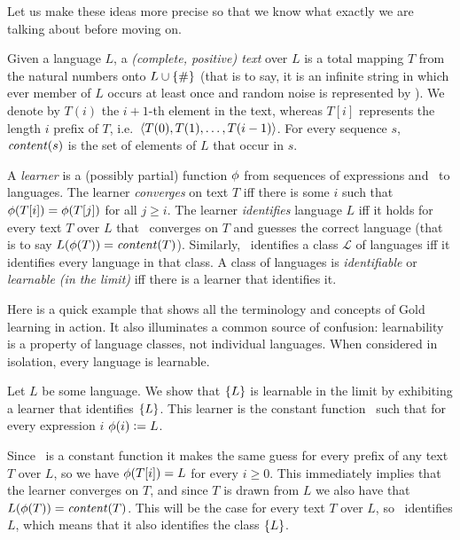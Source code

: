 Let us make these ideas more precise so that we know what exactly we are talking about before moving on.
%
\begin{definition}[Text]
    Given a language $L$, a \emph{(complete, positive) text} over $L$ is a total mapping $T$ from the natural numbers onto $L \cup \left \{ \# \right \}$ (that is to say, it is an infinite string in which ever member of $L$ occurs at least once and random noise is represented by \Noise).
    We denote by $T(i)$ the $i+1$-th element in the text, whereas $T[i]$ represents the length $i$ prefix of $T$, i.e.\ $\left \langle T(0), T(1), \ldots, T(i-1) \right \rangle $.
    For every sequence $s$, $\mathit{content}(s)$ is the set of elements of $L$ that occur in $s$.
\end{definition}
%
\begin{definition}
    A \emph{learner} is a (possibly partial) function $\phi$ from sequences of expressions and \Noise\ to languages.
    The learner \emph{converges} on text $T$ iff there is some $i$ such that $\phi(T[i]) = \phi(T[j])$ for all $j \geq i$.
    The learner \emph{identifies} language $L$ iff it holds for every text $T$ over $L$ that \Learner\ converges on $T$ and guesses the correct language (that is to say $L(\phi(T)) = \mathit{content}(T)$).
    Similarly, \Learner\ identifies a class $\mathcal{L}$ of languages iff it identifies every language in that class.
    A class of languages is \emph{identifiable} or \emph{learnable (in the limit)} iff there is a learner that identifies it.
\end{definition}
%
\begin{examplebox}
    Here is a quick example that shows all the terminology and concepts of Gold learning in action.
    It also illuminates a common source of confusion: learnability is a property of language classes, not individual languages.
    When considered in isolation, every language is learnable.

    Let $L$ be some language.
    We show that $\left \{ L \right \}$ is learnable in the limit by exhibiting a learner that identifies $\left \{ L \right \}$.
    This learner is the constant function \Learner\ such that for every expression $i$ $\phi(i) \mathrel{\mathop:}= L$.

    Since \Learner\ is a constant function it makes the same guess for every prefix of any text $T$ over $L$, so we have $\phi(T[i]) = L$ for every $i \geq 0$.
    This immediately implies that the learner converges on $T$, and since $T$ is drawn from $L$ we also have that $L(\phi(T)) = \mathit{content}(T)$.
    This will be the case for every text $T$ over $L$, so \Learner\ identifies $L$, which means that it also identifies the class $\left \{ L \right \}$.
\end{examplebox}
